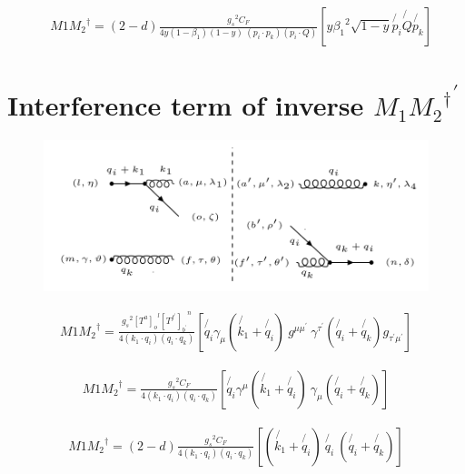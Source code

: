 \begin{equation}
\begin{split}
&M1{M_2}^{\dagger}=(2-d)\frac{{g_s}^2 C_F}{4y(1-\beta_1) (1-y)\:(p_i \cdot p_k)(p_i \cdot Q)}[y{\beta_1}^2 \sqrt{1-y}\not{p_i} \not{Q}\not{p_k}]
\end{split}
\end{equation}

\section{Interference term of inverse ${M_1{M_2}^{\dagger}}^{\prime}$}
\begin{figure}[ht!]
\centering
\includegraphics[scale=0.7]{images/GQ/M1M2DaggerInverse.png}
\end{figure}

\begin{equation}
\begin{split}
M1{M_2}^{\dagger}=\frac{{g_s}^2 {[T^{a}]_o}^{l} {[T^{f^{\prime}}]_{b^{\prime}}}^{n}}{4(k_1 \cdot q_i)(q_i \cdot q_k)}[\not{q_i}{\gamma}_{\mu}(\not{k_1}+\not{q_i})\:g^{\mu \mu^{\prime}}\: {\gamma}^{{{\tau}^{\prime}}}(\not{q_i}+\not{q_k}) g_{\tau^{\prime} \mu^{\prime}}]
\end{split}
\end{equation}

\begin{equation}
\begin{split}
M1{M_2}^{\dagger}=\frac{{g_s}^2 C_F}{4(k_1 \cdot q_i)(q_i \cdot q_k)}[\not{q_i}{\gamma}^{\mu}(\not{k_1}+\not{q_i})\: {\gamma}_{{{\mu}}}(\not{q_i}+\not{q_k})]
\end{split}
\end{equation}

\begin{equation}
\begin{split}
M1{M_2}^{\dagger}=(2-d)\frac{{g_s}^2 C_F}{4(k_1 \cdot q_i)(q_i \cdot q_k)}[(\not{k_1}+\not{q_i})\: \not{q_i} \:(\not{q_i}+\not{q_k})]
\end{split}
\end{equation}

